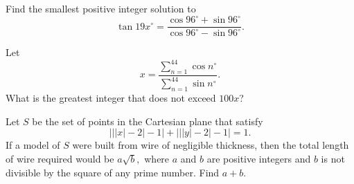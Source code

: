 \documentclass[11pt]{article}
\theoremstyle{definition}
\begin{document}
%	












\begin{question}[name={1996 AIME, \href{https://artofproblemsolving.com/community/c4p394244}{Problem 10}}]
	Find the smallest positive integer solution to $$\tan 19x^\circ=\frac{\cos 96^\circ+\sin 96^\circ}{\cos 96^\circ-\sin 96^\circ}.$$
\end{question}


%	












\begin{question}[name={1997 AIME, \href{https://artofproblemsolving.com/community/c4p393654}{Problem 11}}]
	Let $$x=\frac{\displaystyle\sum_{n=1}^{44} \cos n^\circ}{\displaystyle \sum_{n=1}^{44} \sin n^\circ}.$$ What is the greatest integer that does not exceed $100x$?
\end{question}


%	













\begin{question}[name={1997 AIME, \href{https://artofproblemsolving.com/community/c4p393657}{Problem 13}}]
	Let $ S$ be the set of points in the Cartesian plane that satisfy
	\[ \Big|\big|{|x| - 2}\big| - 1\Big| + \Big|\big|{|y| - 2}\big| - 1\Big| = 1.
	\]
	If a model of $ S$ were built from wire of negligible thickness, then the total length of wire required would be $ a\sqrt {b},$ where $ a$ and $ b$ are positive integers and $ b$ is not divisible by the square of any prime number. Find $ a + b.$
\end{question}
\end{document}
